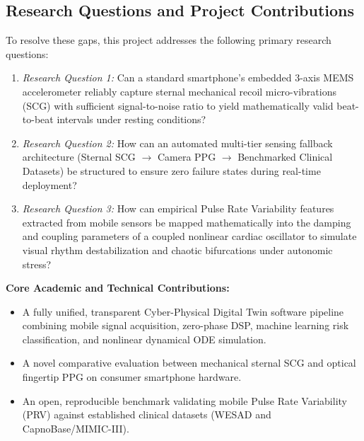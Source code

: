 \documentclass[11pt,a4paper]{article}
\begin{document}
\subsection{Research Questions and Project Contributions}
To resolve these gaps, this project addresses the following primary research questions:
\begin{enumerate}[leftmargin=2.5em]
    \item \textit{Research Question 1:} Can a standard smartphone's embedded 3-axis MEMS accelerometer reliably capture sternal mechanical recoil micro-vibrations (SCG) with sufficient signal-to-noise ratio to yield mathematically valid beat-to-beat intervals under resting conditions?
    \item \textit{Research Question 2:} How can an automated multi-tier sensing fallback architecture (Sternal SCG $\rightarrow$ Camera PPG $\rightarrow$ Benchmarked Clinical Datasets) be structured to ensure zero failure states during real-time deployment?
    \item \textit{Research Question 3:} How can empirical Pulse Rate Variability features extracted from mobile sensors be mapped mathematically into the damping and coupling parameters of a coupled nonlinear cardiac oscillator to simulate visual rhythm destabilization and chaotic bifurcations under autonomic stress?
\end{enumerate}

\noindent\textbf{Core Academic and Technical Contributions:}
\begin{itemize}[leftmargin=2.5em]
    \item A fully unified, transparent Cyber-Physical Digital Twin software pipeline combining mobile signal acquisition, zero-phase DSP, machine learning risk classification, and nonlinear dynamical ODE simulation.
    \item A novel comparative evaluation between mechanical sternal SCG and optical fingertip PPG on consumer smartphone hardware.
    \item An open, reproducible benchmark validating mobile Pulse Rate Variability (PRV) against established clinical datasets (WESAD and CapnoBase/MIMIC-III).
\end{itemize}
\end{document}
